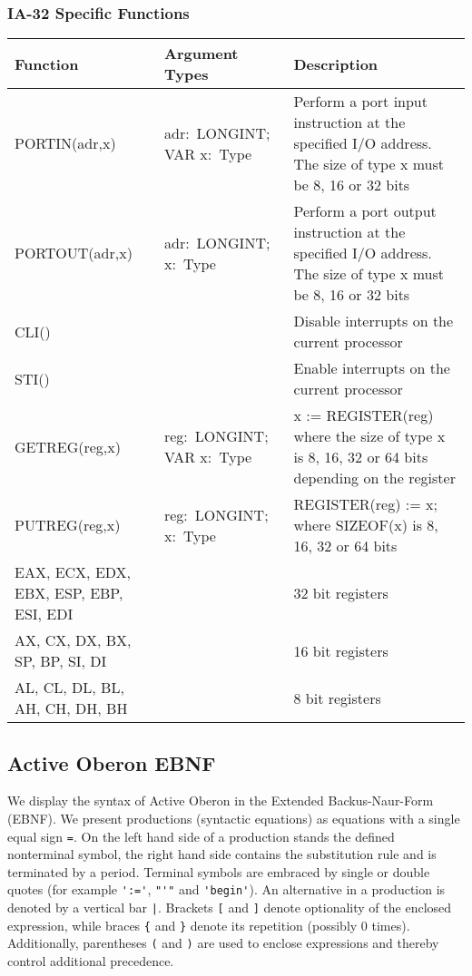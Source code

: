 \documentclass[a4paper,11pt]{article}
\begin{document}
\subsubsection{IA-32 Specific Functions}
\begin{longtable}{|p{3cm}|v{3cm}|p{8cm}|}
\hline
Function & Argument Types & Description \\
\hline\hline
\endhead
PORTIN(adr,x) & adr:~LONGINT; VAR x:~Type & Perform a port input instruction at the specified I/O address. The size of type x must be 8, 16 or 32 bits \\
PORTOUT(adr,x) & adr:~LONGINT; x:~Type & Perform a port output instruction at the specified I/O address. The size of type x must be 8, 16 or 32 bits \\
\hline
CLI() && Disable interrupts on the current processor \\
STI() && Enable interrupts on the current processor \\
\hline
GETREG(reg,x) & reg:~LONGINT; VAR x:~Type & x := REGISTER(reg) where the size of type x is 8, 16, 32 or 64 bits depending on the register \\
PUTREG(reg,x) & reg:~LONGINT; x:~Type & REGISTER(reg) := x; where SIZEOF(x) is 8, 16, 32 or 64 bits \\
\hline
EAX, ECX, EDX, EBX, ESP, EBP, ESI, EDI && 32 bit registers \\
AX, CX, DX, BX, SP, BP, SI, DI && 16 bit registers \\
AL, CL, DL, BL, AH, CH, DH, BH && 8 bit registers \\
\hline
\end{longtable}


\subsection{Active Oberon EBNF}
We display the syntax of Active Oberon in the Extended Backus-Naur-Form (EBNF). We present productions (syntactic equations) as equations with a single equal sign \verb~=~. On the left hand side of a production stands the defined nonterminal symbol, the right hand side contains the substitution rule and is terminated by a period. Terminal symbols are embraced by single or double quotes (for example \verb~':='~, \verb~"'"~ and \verb~'begin'~). An alternative in a production is denoted by a vertical bar \verb~|~. Brackets \verb~[~ and \verb~]~ denote optionality of the enclosed expression, while braces \verb~{~ and \verb~}~ denote its repetition (possibly 0 times). Additionally, parentheses \verb~(~ and \verb~)~ are used to enclose expressions and thereby control additional precedence.
\end{document}
